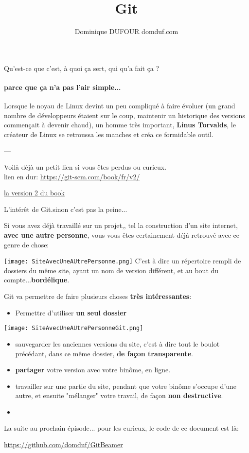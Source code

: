 \documentclass[10pt]{beamer}
\author{Dominique DUFOUR domduf.com}
\title{Git}
\begin{document}
\begin{frame}
\titlepage
\end{frame}

\begin{frame}
\tableofcontents
\end{frame}

\begin{frame}{Qu'est-ce que c'est, à quoi ça sert, qui qu'a fait ça ?}
\framesubtitle{parce que ça n'a pas l'air simple...}

Lorsque le noyau de Linux devint un peu compliqué à faire évoluer (un grand nombre de développeurs étaient sur le coup, maintenir un historique des versions commençait à devenir chaud), un homme très important, \textbf{Linus Torvalds}, le créateur de Linux se retroussa les manches et créa ce formidable outil.

---

Voilà déjà un petit lien si vous êtes perdus ou curieux.
\\
lien en dur: \url{https://git-scm.com/book/fr/v2/}

\href{https://git-scm.com/book/fr/v2/}{la version 2 du book}

\end{frame}



\begin{frame}{L'intérêt de Git.}{sinon c'est pas la peine...}

Si vous avez déjà travaillé sur un projet,, tel la construction d'un site internet, \textbf{avec une autre personne}, vous vous êtes 
certainement déjà retrouvé avec ce genre de chose:

\texttt{[image: SiteAvecUneAUtrePersonne.png]}
C'est à dire un répertoire rempli de dossiers du même site, ayant un nom de version différent, et au bout du compte...\textbf{bordélique}.

\end{frame}



\begin{frame}
Git va permettre de faire plusieurs choses \textbf{très intéressantes}:
\begin{itemize}
\item Permettre d'utiliser \textbf{un seul dossier}
\end{itemize}
\texttt{[image: SiteAvecUneAUtrePersonneGit.png]}

\begin{itemize}
\item sauvegarder les anciennes versions du site, c'est à dire tout le boulot précédant, dans ce même dossier, \textbf{de façon transparente}.
\item \textbf{partager} votre version avec votre binôme, en ligne.
\item travailler sur une partie du site, pendant que votre binôme s'occupe d'une autre, et ensuite "mélanger" votre travail, de façon \textbf{non destructive}.
\item 
\end{itemize}

\end{frame}



\begin{frame}
La suite au prochain épisode...
pour les curieux, le code de ce document est là:

\href{https://github.com/domduf/GitBeamer}{https://github.com/domduf/GitBeamer}
\end{frame}
\end{document}
